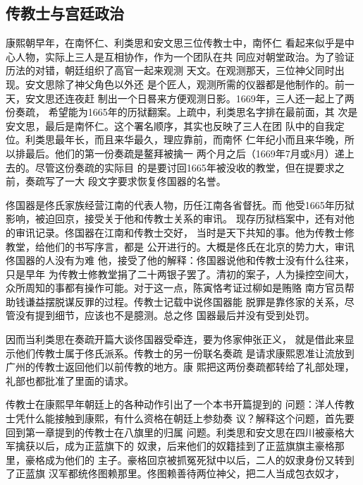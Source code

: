 \subsection{传教士与宫廷政治}
\par
康熙朝早年，在南怀仁、利类思和安文思三位传教士中，南怀仁%
看起来似乎是中心人物，实际上三人是互相协作，作为一个团队在共%
同应对朝堂政治。为了验证历法的对错，朝廷组织了高官一起来观测%
天文。在观测那天，三位神父同时出现。安文思除了神父角色以外还%
是个匠人，观测所需的仪器都是他制作的。前一天，安文思还连夜赶%
制出一个日晷来方便观测日影。1669年，三人还一起上了两份奏疏，%
希望能为1665年的历狱翻案。上疏中，利类思名字排在最前面，其%
次是安文思，最后是南怀仁。这个署名顺序，其实也反映了三人在团%
队中的自我定位。利类思最年长，而且来华最久，理应靠前，而南怀%
仁年纪小而且来华晚，所以排最后。他们的第一份奏疏是鳌拜被擒一%
两个月之后（1669年7月或8月）递上去的。尽管这份奏疏的实际目%
的是要讨回1665年被没收的教堂，但在提要求之前，奏疏写了一大%
段文字要求恢复佟国器的名誉。%
\par
佟国器是佟氏家族经营江南的代表人物，历任江南各省督抚。而%
他受1665年历狱影响，被迫回京，接受关于他和传教士关系的审讯。%
现存历狱档案中，还有对他的审讯记录。佟国器在江南和传教士交好，%
当时是天下共知的事。他为传教士修教堂，给他们的书写序言，都是%
公开进行的。大概是佟氏在北京的势力大，审讯佟国器的人没有为难%
他，接受了他的解释：佟国器说他和传教士没有什么往来，只是早年%
为传教士修教堂捐了二十两银子罢了。清初的案子，人为操控空间大，%
众所周知的事都有操作可能。对于这一点，陈寅恪考证过柳如是贿赂%
南方官员帮助钱谦益摆脱谋反罪的过程。传教士记载中说佟国器能%
脱罪是靠佟家的关系，尽管没有提到细节，应该也不是臆测。总之佟%
国器最后并没有受到处罚。%
\par
因而当利类思在奏疏开篇大谈佟国器受牵连，要为佟家伸张正义，%
就是借此来显示他们传教士属于佟氏派系。传教士的另一份联名奏疏%
是请求康熙恩准让流放到广州的传教士返回他们以前传教的地方。康%
熙把这两份奏疏都转给了礼部处理，礼部也都批准了里面的请求。%
\par
传教士在康熙早年朝廷上的各种动作引出了一个本书开篇提到的%
问题：洋人传教士凭什么能接触到康熙，有什么资格在朝廷上参劾奏%
议？解释这个问题，首先要回到第一章提到的传教士在八旗里的归属%
问题。利类思和安文思在四川被豪格大军擒获以后，成为正蓝旗下的%
奴隶，后来他们的奴籍挂到了正蓝旗旗主豪格那里，豪格成为他们的%
主子。豪格回京被抓冤死狱中以后，二人的奴隶身份又转到了正蓝旗%
汉军都统佟图赖那里。佟图赖善待两位神父，把二人当成包衣奴才，%
